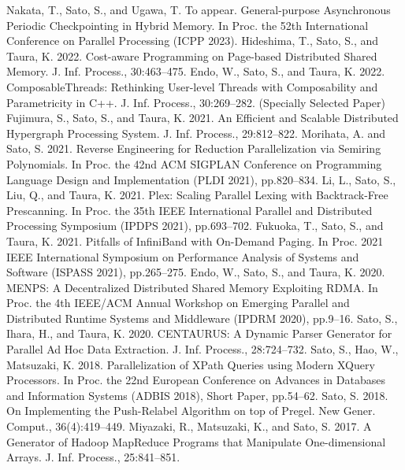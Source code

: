 \documentclass[a4paper,dvipdfmx]{article}
\begin{document}
\newpage
\renewcommand{\refname}{Publications (Refereed)}
\begin{thebibliography}{100}
  Nakata, T., Sato, S., and Ugawa, T. To appear. General-purpose Asynchronous Periodic Checkpointing in Hybrid Memory. In Proc. the 52th International Conference on Parallel Processing (ICPP 2023).
  Hideshima, T., Sato, S., and Taura, K. 2022. Cost-aware Programming on Page-based Distributed Shared Memory. J. Inf. Process., 30:463–475.
  Endo, W., Sato, S., and Taura, K. 2022. ComposableThreads: Rethinking User-level Threads with Composability and Parametricity in C++. J. Inf. Process., 30:269–282. (Specially Selected Paper)
  Fujimura, S., Sato, S., and Taura, K. 2021. An Efficient and Scalable Distributed Hypergraph Processing System. J. Inf. Process., 29:812–822.
  Morihata, A. and Sato, S. 2021. Reverse Engineering for Reduction Parallelization via Semiring Polynomials. In Proc. the 42nd ACM SIGPLAN Conference on Programming Language Design and Implementation (PLDI 2021), pp.820–834.
  Li, L., Sato, S., Liu, Q., and Taura, K. 2021. Plex: Scaling Parallel Lexing with Backtrack-Free Prescanning. In Proc. the 35th IEEE International Parallel and Distributed Processing Symposium (IPDPS 2021), pp.693–702.
  Fukuoka, T., Sato, S., and Taura, K. 2021. Pitfalls of InfiniBand with On-Demand Paging. In Proc. 2021 IEEE International Symposium on Performance Analysis of Systems and Software (ISPASS 2021), pp.265–275.
  Endo, W., Sato, S., and Taura, K. 2020. MENPS: A Decentralized Distributed Shared Memory Exploiting RDMA. In Proc. the 4th IEEE/ACM Annual Workshop on Emerging Parallel and Distributed Runtime Systems and Middleware (IPDRM 2020), pp.9–16.
  Sato, S., Ihara, H., and Taura, K. 2020. CENTAURUS: A Dynamic Parser Generator for Parallel Ad Hoc Data Extraction. J. Inf. Process., 28:724–732.
  Sato, S., Hao, W., Matsuzaki, K. 2018. Parallelization of XPath Queries using Modern XQuery Processors. In Proc. the 22nd European Conference on Advances in Databases and Information Systems (ADBIS 2018), Short Paper, pp.54–62.
  Sato, S. 2018. On Implementing the Push-Relabel Algorithm on top of Pregel. New Gener. Comput., 36(4):419–449.
  Miyazaki, R., Matsuzaki, K., and Sato, S. 2017. A Generator of Hadoop MapReduce Programs that Manipulate One-dimensional Arrays. J. Inf. Process., 25:841–851.

\end{thebibliography}
\end{document}
